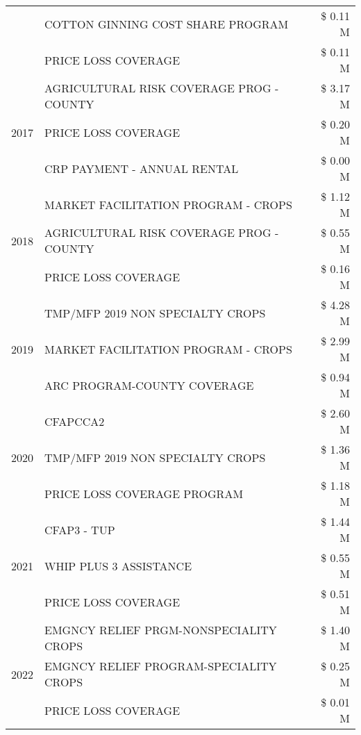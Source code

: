 \begin{tabular}{llr}
 & COTTON GINNING COST SHARE PROGRAM & \$ 0.11 M \\
 & PRICE LOSS COVERAGE & \$ 0.11 M \\
\cline{1-3}
\multirow[t]{3}{*}{2017} & AGRICULTURAL RISK COVERAGE PROG - COUNTY & \$ 3.17 M \\
 & PRICE LOSS COVERAGE & \$ 0.20 M \\
 & CRP PAYMENT - ANNUAL RENTAL & \$ 0.00 M \\
\cline{1-3}
\multirow[t]{3}{*}{2018} & MARKET FACILITATION PROGRAM - CROPS & \$ 1.12 M \\
 & AGRICULTURAL RISK COVERAGE PROG - COUNTY & \$ 0.55 M \\
 & PRICE LOSS COVERAGE & \$ 0.16 M \\
\cline{1-3}
\multirow[t]{3}{*}{2019} & TMP/MFP 2019 NON SPECIALTY CROPS & \$ 4.28 M \\
 & MARKET FACILITATION PROGRAM - CROPS & \$ 2.99 M \\
 & ARC PROGRAM-COUNTY COVERAGE & \$ 0.94 M \\
\cline{1-3}
\multirow[t]{3}{*}{2020} & CFAPCCA2 & \$ 2.60 M \\
 & TMP/MFP 2019 NON SPECIALTY CROPS & \$ 1.36 M \\
 & PRICE LOSS COVERAGE PROGRAM & \$ 1.18 M \\
\cline{1-3}
\multirow[t]{3}{*}{2021} & CFAP3 - TUP & \$ 1.44 M \\
 & WHIP PLUS 3 ASSISTANCE & \$ 0.55 M \\
 & PRICE LOSS COVERAGE & \$ 0.51 M \\
\cline{1-3}
\multirow[t]{3}{*}{2022} & EMGNCY RELIEF PRGM-NONSPECIALITY CROPS & \$ 1.40 M \\
 & EMGNCY RELIEF PROGRAM-SPECIALITY CROPS & \$ 0.25 M \\
 & PRICE LOSS COVERAGE & \$ 0.01 M \\
\cline{1-3}
\bottomrule
\end{tabular}
